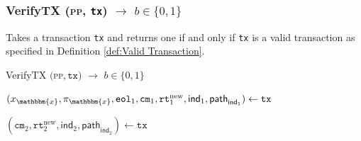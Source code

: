 \newpage

\subsubsection{\textsf{VerifyTX} (\textsc{pp}, \texttt{tx}) $\rightarrow$ $b \in \{0, 1\}$}

Takes a transaction \texttt{tx} and returns one if and only if \texttt{tx} is a valid transaction as specified in Definition \ref{def:Valid Transaction}.

\begin{algorithm}
\caption{\textsf{VerifyTX} $\big($\textsc{pp}$, \texttt{tx} \big)$ $\rightarrow$ $b \in \{0, 1\}$}\label{alg:VerifyTX}
\begin{algorithmic}[1]
  
\State $(x_\mathbbm{x}, \pi_\mathbbm{x}, \texttt{eol}_1, \texttt{cm}_1, \texttt{rt}_1^{\text{new}}, \mathsf{ind}_{1}, \mathsf{path}_{\mathsf{ind}_{1}}) \gets \texttt{tx}$

\State {}
\EndIf

    \State {}
    \EndIf
\EndIf


\State {}
\EndIf
\State {}
\EndIf
{} 
    \State $(\texttt{cm}_2, \texttt{rt}_2^{\text{new}}, \mathsf{ind}_{2}, \mathsf{path}_{\mathsf{ind}_{2}}) \gets \texttt{tx}$
    \State {}
\EndIf

\EndIf

\State {}
\end{algorithmic}
\end{algorithm}


\newpage

